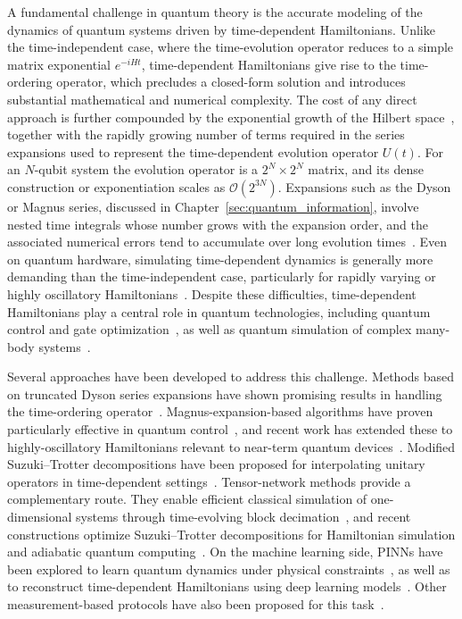 A fundamental challenge in quantum theory is the accurate modeling of the dynamics of quantum systems driven by time-dependent Hamiltonians. Unlike the time-independent case, where the time-evolution operator reduces to a simple matrix exponential $e^{-iHt}$, time-dependent Hamiltonians give rise to the time-ordering operator, which precludes a closed-form solution and introduces substantial mathematical and numerical complexity. The cost of any direct approach is further compounded by the exponential growth of the Hilbert space~\cite{lloyd1996}, together with the rapidly growing number of terms required in the series expansions used to represent the time-dependent evolution operator $U(t)$. For an $N$-qubit system the evolution operator is a $2^N \times 2^N$ matrix, and its dense construction or exponentiation scales as $\mathcal{O}(2^{3N})$. Expansions such as the Dyson or Magnus series, discussed in Chapter~\ref{sec:quantum_information}, involve nested time integrals whose number grows with the expansion order, and the associated numerical errors tend to accumulate over long evolution times~\cite{wiebe_simulating_2011, blanes2009}. Even on quantum hardware, simulating time-dependent dynamics is generally more demanding than the time-independent case, particularly for rapidly varying or highly oscillatory Hamiltonians~\cite{an2022}. Despite these difficulties, time-dependent Hamiltonians play a central role in quantum technologies, including quantum control and gate optimization~\cite{Ansel_2024}, as well as quantum simulation of complex many-body systems~\cite{georgescu2014, cao2025}.

Several approaches have been developed to address this challenge. Methods based on truncated Dyson series expansions have shown promising results in handling the time-ordering operator~\cite{berry_2015, krieferova_2019}. Magnus-expansion-based algorithms have proven particularly effective in quantum control~\cite{Dalgaard_2022}, and recent work has extended these to highly-oscillatory Hamiltonians relevant to near-term quantum devices~\cite{chen_quantum_2023, fang_time-dependent_2024}. Modified Suzuki--Trotter decompositions have been proposed for interpolating unitary operators in time-dependent settings~\cite{schilling2024}. Tensor-network methods provide a complementary route. They enable efficient classical simulation of one-dimensional systems through time-evolving block decimation~\cite{vidal_efficient_2004}, and recent constructions optimize Suzuki--Trotter decompositions for Hamiltonian simulation and adiabatic quantum computing~\cite{tepaske2023, causer2024}. On the machine learning side, PINNs have been explored to learn quantum dynamics under physical constraints~\cite{norambuena2024}, as well as to reconstruct time-dependent Hamiltonians using deep learning models~\cite{che_2021, han_2021}. Other measurement-based protocols have also been proposed for this task~\cite{franceschetto2025}.

